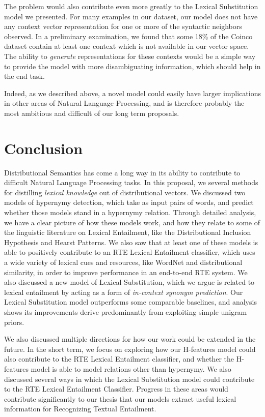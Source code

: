 \documentclass[12pt]{article}
\begin{document}
The problem would also contribute even more greatly to the Lexical Substitution
model we presented. For many examples in our dataset, our model does not have
any context vector representation for one or more of the syntactic neighbors
observed. In a preliminary examination, we found that some 18\% of the Coinco
dataset contain at least one context which is not available in our vector space.
The ability to {\em generate} representations for these contexts would be
a simple way to provide the model with more disambiguating information, which
should help in the end task.

Indeed, as we described above, a novel model could easily have larger
implications in other areas of Natural Language Processing, and is therefore
probably the most ambitious and difficult of our long term proposals.

\section{Conclusion}

Distributional Semantics has come a long way in its ability to contribute to
difficult Natural Language Processing tasks. In this proposal, we several
methods for distilling {\em lexical knowledge} out of distributional vectors.
We discussed two models of hypernymy detection, which take as input pairs of
words, and predict whether those models stand in a hypernymy relation.  Through
detailed analysis, we have a clear picture of how these models work, and how
they relate to some of the linguistic literature on Lexical Entailment, like
the Distributional Inclusion Hypothesis and Hearst Patterns. We also saw that
at least one of these models is able to positively contribute to an RTE Lexical
Entailment classifier, which uses a wide variety of lexical cues and resources,
like WordNet and distributional similarity, in order to improve performance in
an end-to-end RTE system. We also discussed a new model of Lexical
Substitution, which we argue is related to lexical entailment by acting as a
form of {\em in-context synonym prediction}. Our Lexical Substitution model
outperforms some comparable baselines, and analysis shows its improvements
derive predominantly from exploiting simple unigram priors.

We also discussed multiple directions for how our work could be extended
in the future. In the short term, we focus on exploring how our H-features
model could also contribute to the RTE Lexical Entailment classifier, and
whether the H-features model is able to model relations other than hypernymy.
We also discussed several ways in which the Lexical Substitution model could
contribute to the RTE Lexical Entailment Classifier. Progress in these areas
would contribute significantly to our thesis that our models extract useful
lexical information for Recognizing Textual Entailment.
\end{document}
